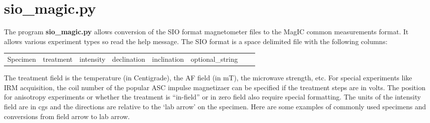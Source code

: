 \documentclass[11pt]{book}
\begin{document}
{{%






\section {\bf sio\_magic.py}
\label{ex:sio_magic}


The program {\bf sio\_magic.py} allows conversion of the SIO format magnetometer files to the MagIC common measurements format.    It allows various experiment types so read the help message.    The SIO format is a space delimited file with the following columns:

\begin{tabular}{llllllll}
Specimen&treatment&intensity&declination&inclination&optional\_string\\
\end{tabular}

The treatment field is the temperature (in Centigrade), the AF field (in mT), the microwave strength, etc.  For special experiments like IRM acquisition, the  coil number of the popular ASC impulse magnetizaer can be specified if the treatment steps are in volts.  The position for anisotropy experiments or whether the treatment is ``in-field'' or in zero field also require special formatting.  The units of the intensity field are in cgs and the directions are relative to the `lab arrow' on the specimen.  Here are some examples of commonly used specimens and conversions from field arrow to lab arrow.  

}}
\end{document}

